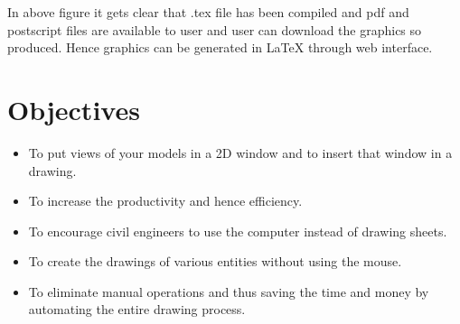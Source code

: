 \noindent In above figure it gets clear that .tex file has been compiled and pdf and postscript files
are available to user and user can download the graphics so produced. Hence graphics
can be generated in \LaTeX{} through web interface.

\section{Objectives}
\begin{itemize}
\item To put views of your models in a 2D window and to insert that window in a drawing.
\item To increase the productivity and hence efficiency.
\item To encourage civil engineers to use the computer instead of drawing sheets.
\item To create the drawings of various entities without using the mouse.
\item To eliminate manual operations and thus saving the time and money by automating the entire drawing process.
\end{itemize}
